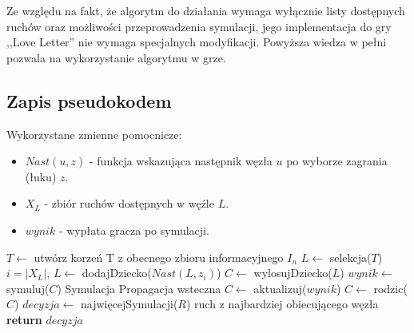 Ze względu na fakt, że algorytm do działania wymaga wyłącznie listy dostępnych ruchów oraz możliwości przeprowadzenia symulacji, jego implementacja do gry ,,Love Letter'' nie wymaga specjalnych modyfikacji. Powyższa wiedza w pełni pozwala na wykorzystanie algorytmu w grze.
\subsection{Zapis pseudokodem}
Wykorzystane zmienne pomocnicze:
\begin{itemize}
	\item $Nast(u, z)$ - funkcja wskazująca następnik węzła $u$ po wyborze zagrania (łuku) $z$.
	\item $X_L$ - zbiór ruchów dostępnych w węźle $L$.
	\item $wynik$ - wypłata gracza po symulacji.
\end{itemize}
\begin{algorithmic}[1]
		\State $T \gets $ utwórz korzeń T z obecnego zbioru informacyjnego $I_n$
		\Repeat
			\State $L \gets $ selekcja($T$)
				 \Comment $i=|X_L|$, 
					\State $L \gets$ dodajDziecko($Nast(L, z_i)$)
				\EndFor
				\State $C \gets$ wylosujDziecko($L$)
				\State $wynik \gets$ symuluj($C$)	\Comment Symulacja
				\Repeat	\Comment Propagacja wsteczna
					\State $C \gets $ aktualizuj($wynik$)
					\State $C \gets $ rodzic($C$)
			\EndIf 
		\State $decyzja \gets$ najwięcejSymulacji($R$) \Comment ruch z najbardziej obiecującego węzła 
		\State \textbf{return} $decyzja$
	\EndFunction
\end{algorithmic}